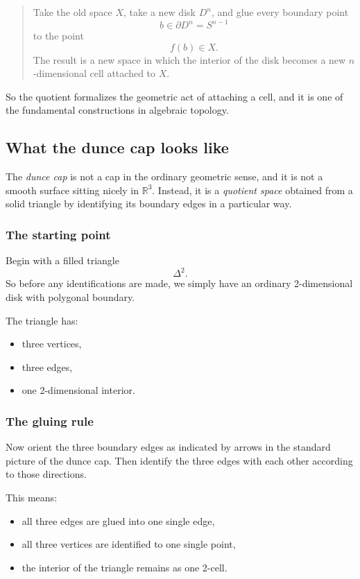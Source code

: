 \documentclass[12pt,a4paper]{article}
\theoremstyle{notespace}
\begin{document}
\begin{quote}
	Take the old space \(X\), take a new disk \(D^n\), and glue every boundary point
	\[
	b\in \partial D^n=S^{n-1}
	\]
	to the point
	\[
	f(b)\in X.
	\]
	The result is a new space in which the interior of the disk becomes a new \(n\)-dimensional cell attached to \(X\).
\end{quote}

So the quotient formalizes the geometric act of attaching a cell, and it is one of the fundamental constructions in algebraic topology.

\subsection{What the dunce cap looks like}

The \emph{dunce cap} is not a cap in the ordinary geometric sense, and it is not a smooth surface sitting nicely in \(\mathbb{R}^3\). Instead, it is a \emph{quotient space} obtained from a solid triangle by identifying its boundary edges in a particular way.

\subsubsection{The starting point}

Begin with a filled triangle
\[
\Delta^2.
\]
So before any identifications are made, we simply have an ordinary 2-dimensional disk with polygonal boundary.

The triangle has:

\begin{itemize}
	\item three vertices,
	\item three edges,
	\item one 2-dimensional interior.
\end{itemize}

\subsubsection{The gluing rule}

Now orient the three boundary edges as indicated by arrows in the standard picture of the dunce cap. Then identify the three edges with each other according to those directions.

This means:

\begin{itemize}
	\item all three edges are glued into one single edge,
	\item all three vertices are identified to one single point,
	\item the interior of the triangle remains as one 2-cell.
\end{itemize}
\end{document}
